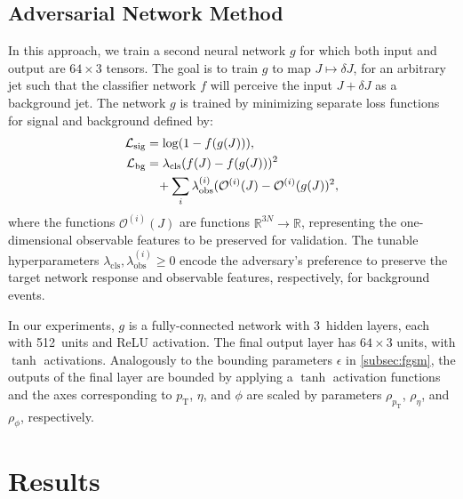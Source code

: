 \documentclass[reprint,nofootinbib,...]{revtex4-1}
\newcommand{\nconst}{64}       %
\newcommand{\nlayerADV}{3}
\newcommand{\nunitsADV}{512}
\newcommand{\pt}{p_\mathrm{T}} %
\begin{document}
\subsection{Adversarial Network Method}
\label{sec:adversarial}

In this approach, we train a second neural network $g$ for which both input and output are $\nconst\times 3$ tensors.
The goal is to train $g$ to map $J\mapsto\delta J$, for an arbitrary jet such that the classifier network $f$ will perceive the input $J+\delta J$ as a background jet.
The network $g$ is trained by minimizing separate loss functions for signal and background defined by:
\begin{align}
\mathcal{L}_\text{sig}&=\log(1-f(g(J))),\\\nonumber
\mathcal{L}_\text{bg}&=\lambda_\mathrm{cls} (f(J)-f(g(J)))^2\\
&\hspace{3mm}+\sum_i \lambda^{(i)}_\mathrm{obs} (\mathcal{O}^{(i)}(J)-\mathcal{O}^{(i)}(g(J))^2,
\end{align}
where the functions $\mathcal{O}^{(i)}(J)$ are functions $\mathbb{R}^{3N}\rightarrow \mathbb{R}$, representing the one-dimensional observable features to be preserved for validation.
The tunable hyperparameters $\lambda_\mathrm{cls}, \lambda^{(i)}_\mathrm{obs} \geq 0$ encode the adversary's preference to preserve the target network response and observable features, respectively, for background events.

In our experiments, $g$ is a fully-connected network with \nlayerADV\ hidden layers, each with \nunitsADV\ units and ReLU activation.
The final output layer has $\nconst\times 3$ units, with $\tanh$ activations.
Analogously to the bounding parameters $\epsilon$ in \ref{subsec:fgsm}, the outputs of the final layer are bounded by applying a $\tanh$ activation functions and the axes corresponding to $\pt$, $\eta$, and $\phi$ are scaled by parameters $\rho_{\pt}$, $\rho_\eta$, and $\rho_\phi$, respectively.


\section{Results}
\end{document}
